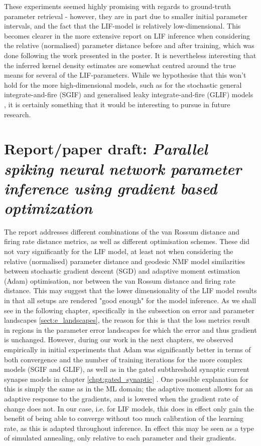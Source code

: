 \documentclass[mphil,deptreport,ianc]{infthesis} %
\begin{document}
These experiments seemed highly promising with regards to ground-truth parameter retrieval - however, they are in part due to smaller initial parameter intervals, and the fact that the LIF-model is relatively low-dimensional.
This becomes clearer in the more extensive report on LIF inference when considering the relative (normalised) parameter distance before and after training, which was done following the work presented in the poster.
It is nevertheless interesting that the inferred kernel density estimates are somewhat centred around the true means for several of the LIF-parameters.
While we hypothesise that this won't hold for the more high-dimensional models, such as for the stochastic general integrate-and-fire (SGIF) \cite{Rene2020} and generalised leaky integrate-and-fire (GLIF) models \cite{allen_glif_white_paper}, it is certainly something that it would be interesting to pursue in future research.



\section{Report/paper draft: \textit{Parallel spiking neural network parameter inference using gradient based optimization}}

The report addresses different combinations of the van Rossum distance and firing rate distance metrics, as well as different optimisation schemes.
These did not vary significantly for the LIF model, at least not when considering the relative (normalised) parameter distance and geodesic NMF model similarities between stochastic gradient descent (SGD) and adaptive moment estimation (Adam) optimisation, nor between the van Rossum distance and firing rate distance.
This may suggest that the lower dimensionality of the LIF model results in that all setups are rendered "good enough" for the model inference.
As we shall see in the following chapter, specifically in the subsection on error and parameter landscapes \ref{sect:e_landscapes}, the reason for this is that the loss metrics result in regions in the parameter error landscapes for which the error and thus gradient is unchanged.
However, during our work in the next chapters, we observed empirically in initial experiments that Adam was significantly better in terms of both convergence and the number of training iterations for the more complex models (SGIF and GLIF), as well as in the gated subthreshold synaptic current synapse models in chapter \ref{chpt:gated_synaptic} \cite{Huh2017}.
One possible explanation for this is simply the same as in the ML domain; the adaptive moment allows for an adaptive response to the gradients, and is lowered when the gradient rate of change does not.
In our case, i.e. for LIF models, this does in effect only gain the benefit of being able to converge without too much calibration of the learning rate, as this is adapted throughout inference.
In effect this may be seen as a type of simulated annealing, only relative to each parameter and their gradients.
\end{document}
